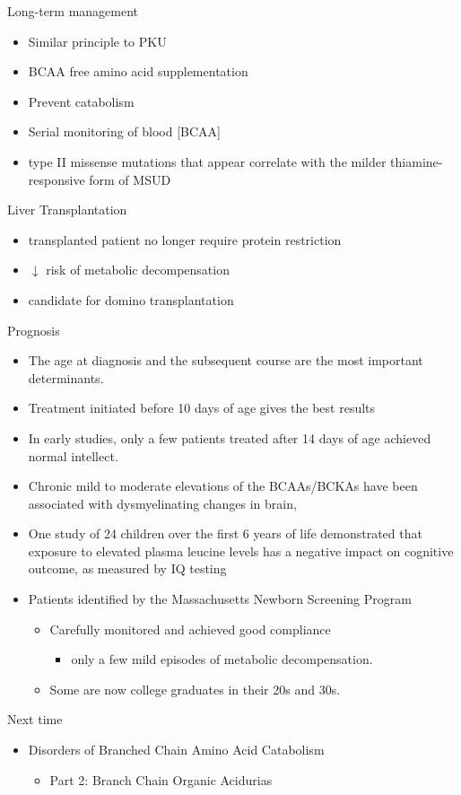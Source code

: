 \documentclass[presentation, smaller]{beamer}
\begin{document}
\begin{frame}[label={sec:orgheadline21}]{Long-term management}
\begin{itemize}
\item Similar principle to PKU
\item BCAA free amino acid supplementation
\item Prevent catabolism
\item Serial monitoring of blood [BCAA]

\item type II missense mutations that appear correlate with the milder
thiamine-responsive form of MSUD
\end{itemize}


\begin{block}{Liver Transplantation}
\begin{itemize}
\item transplanted patient no longer require protein restriction
\item \(\downarrow\) risk of metabolic decompensation
\item candidate for domino transplantation
\end{itemize}
\end{block}
\end{frame}

\begin{frame}[label={sec:orgheadline22}]{Prognosis}
\begin{itemize}
\item The age at diagnosis and the subsequent course are the most
important determinants.
\item Treatment initiated before 10 days of age gives the best results
\item In early studies, only a few patients treated after 14 days of age
achieved normal intellect.
\item Chronic mild to moderate elevations of the BCAAs/BCKAs have been
associated with dysmyelinating changes in brain,
\item One study of 24 children over the first 6 years of life demonstrated
that exposure to elevated plasma leucine levels has a negative
impact on cognitive outcome, as measured by IQ testing
\item Patients identified by the Massachusetts Newborn Screening Program
\begin{itemize}
\item Carefully monitored and achieved good compliance
\begin{itemize}
\item only a few mild episodes of metabolic decompensation.
\end{itemize}
\item Some are now college graduates in their 20s and 30s.
\end{itemize}
\end{itemize}
\end{frame}


\begin{frame}[label={sec:orgheadline23}]{Next time}
\begin{itemize}
\item Disorders of Branched Chain Amino Acid Catabolism
\begin{itemize}
\item Part 2: Branch Chain Organic Acidurias
\end{itemize}
\end{itemize}
\end{frame}
\end{document}
